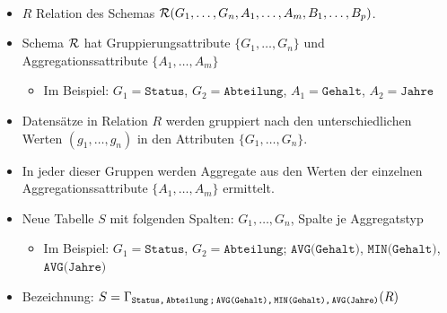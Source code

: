 \begin{frame}
\frametitle{\insertsection}
\framesubtitle{\insertsubsection}
\onslide
{}\\[3pt]
\begin{itemize}
	\item $R$ Relation des Schemas $\mathcal{R}(G_1,\ldots , G_n, A_1, \ldots , A_m,B_1,\ldots , B_p)$.
	\item Schema $\mathcal{R}$ hat Gruppierungsattribute $\{G_1,\ldots , G_n\}$ und Aggregationssattribute $\{A_1,\ldots , A_m\}$
	\begin{itemize}
		\item Im Beispiel: $G_1=\texttt{Status}$, $G_2=\texttt{Abteilung}$, $A_1=\texttt{Gehalt}$, $A_2=\texttt{Jahre}$
	\end{itemize}
	\pause
	\item Datens\"atze in Relation $R$ werden gruppiert nach den unterschiedlichen Werten $(g_1, \ldots , g_n)$ in den Attributen 
	$\{G_1,\ldots , G_n\}$.
	\pause
	\item In jeder dieser Gruppen werden Aggregate aus den Werten der einzelnen Aggregationssattribute $\{A_1,\ldots , A_m\}$
	ermittelt.
	\pause
	\item Neue Tabelle $S$ mit folgenden Spalten: $G_1,\ldots , G_n$, Spalte je Aggregatstyp
	\begin{itemize}
		\item Im Beispiel:
		\nl $G_1=\texttt{Status}$, $G_2=\texttt{Abteilung}$; 
		\nl $\texttt{AVG(Gehalt)}$, $\texttt{MIN(Gehalt)}$, $\texttt{AVG(Jahre)}$ 
	\end{itemize} 
	\pause
	\item Bezeichnung: 
	$S= \Gamma_{\texttt{Status,}\,\texttt{Abteilung\,;}\,
		\texttt{AVG(Gehalt),}\,\texttt{MIN(Gehalt),}\,\texttt{AVG(Jahre)}}(R)$
\end{itemize} 	
\end{frame}

